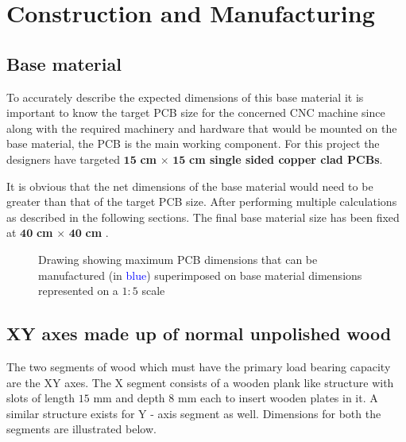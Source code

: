 \chapter{Construction and Manufacturing} \label{chapter3}

\section{Base material} \label{bmaterial}

To accurately describe the expected dimensions of this base material it is important to know the target PCB size for the concerned CNC machine since along with the required machinery and hardware that would be mounted on the base material, the PCB is the main working component. For this project the designers have targeted $\boldsymbol{15}$ \textbf{cm} $\boldsymbol{\times}$ $\boldsymbol{15}$ \textbf{cm single sided copper clad PCBs}. \par

It is obvious that the net dimensions of the base material would need to be greater than that of the target PCB size. After performing multiple calculations as described in the following sections. The final base material size has been fixed at $\boldsymbol{40}$ \textbf{cm} $\boldsymbol{\times}$ $\boldsymbol{40}$ \textbf{cm} .

\begin{figure}[h]
 \centering
 \caption{Drawing showing maximum PCB dimensions that can be manufactured (in \textcolor{blue}{blue}) superimposed on base material dimensions represented on a $1:5$ scale}
 \label{fig:base}
\end{figure}


\section{XY axes made up of normal unpolished wood}

The two segments of wood which must have the primary load bearing capacity are the XY axes. The X segment consists of a wooden plank like structure with slots of length $15$ mm and depth $8$ mm each to insert wooden plates in it. A similar structure exists for Y - axis segment as well. Dimensions for both the segments are illustrated below. \par 


